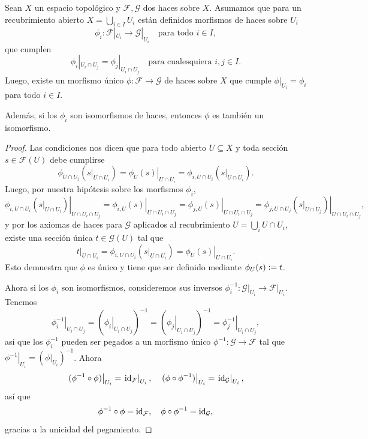 \documentclass{article}
\numberwithin{equation}{section}
\theoremstyle{definition}
\begin{document}
\begin{lema}
  \label{lema:pegamiento-de-morfismos-de-haces}
  Sean $X$ un espacio topológico y $\mathcal{F},\mathcal{G}$ dos haces sobre
  $X$. Asumamos que para un recubrimiento abierto $X = \bigcup_{i\in I} U_i$
  están definidos morfismos de haces sobre $U_i$
  \[ \phi_i\colon \mathcal{F}|_{U_i} \to \mathcal{G}|_{U_i}
     \quad\text{para todo }i\in I, \]
  que cumplen
  \[ \phi_i|_{U_i\cap U_j} = \phi_j|_{U_i\cap U_j}
     \quad\text{para cualesquiera }i,j\in I. \]
  Luego, existe un morfismo único $\phi\colon \mathcal{F} \to \mathcal{G}$ de
  haces sobre $X$ que cumple $\phi|_{U_i} = \phi_i$ para todo $i \in I$.

  Además, si los $\phi_i$ son isomorfismos de haces, entonces $\phi$ es también
  un isomorfismo.

  \begin{proof}
    Las condiciones nos dicen que para todo abierto $U \subseteq X$ y toda
    sección $s \in \mathcal{F} (U)$ debe cumplirse
    $$\phi_{U \cap U_i} (\left.s\right|_{U \cap U_i}) =
    \left.\phi_U (s)\right|_{U \cap U_i} =
    \phi_{i, U \cap U_i} (\left.s\right|_{U \cap U_i}).$$
    Luego, por nuestra hipótesis sobre los morfismos $\phi_i$,
    \[ \left.\phi_{i, U\cap U_i} (\left.s\right|_{U\cap U_i})\right|_{U\cap U_i\cap U_j} =
       \left.\phi_{i,U} (s)\right|_{U\cap U_i\cap U_j} =
       \left.\phi_{j,U} (s)\right|_{U\cap U_i\cap U_j} =
       \left.\phi_{j,U\cap U_j} (\left.s\right|_{U\cap U_j})\right|_{U\cap U_i\cap U_j}, \]
    y por los axiomas de haces para $\mathcal{G}$ aplicados al recubrimiento
    $U = \bigcup_i U \cap U_i$, existe una sección única $t \in \mathcal{G} (U)$
    tal que
    \[ \left.t\right|_{U\cap U_i} =
       \phi_{i,U \cap U_i} (\left.s\right|_{U\cap U_i}) =
       \left.\phi_U (s)\right|_{U\cap U_i}. \]
    Esto demuestra que $\phi$ es único y tiene que ser definido mediante
    $\phi_U (s) \mathrel{\mathop:}= t$.

    \vspace{1em}

    Ahora si los $\phi_i$ son isomorfismos, consideremos sus inversos
    $\phi_i^{-1}\colon \left.\mathcal{G}\right|_{U_i} \to \left.\mathcal{F}\right|_{U_i}$.
    Tenemos
    \[ \left.\phi_i^{-1}\right|_{U_i \cap U_j} =
       (\left.\phi_i\right|_{U_i \cap U_j})^{-1} =
       (\left.\phi_j\right|_{U_i \cap U_j})^{-1} =
       \left.\phi_j^{-1}\right|_{U_i \cap U_j}, \]
    así que los $\phi_i^{-1}$ pueden ser pegados a un morfismo único
    $\phi^{-1}\colon \mathcal{G} \to \mathcal{F}$ tal que
    $\left.\phi^{-1}\right|_{U_i} = (\left.\phi\right|_{U_i})^{-1}$. Ahora
    \[ \left.(\phi^{-1} \circ \phi)\right|_{U_i} =
       \left.\mathrm{id}_{\mathcal{F}}\right|_{U_i}, \quad
       \left.(\phi \circ \phi^{-1})\right|_{U_i} =
       \left.\mathrm{id}_{\mathcal{G}}\right|_{U_i}, \]
    así que
    \[ \phi^{-1} \circ \phi = \mathrm{id}_{\mathcal{F}}, \quad
       \phi \circ \phi^{-1} = \mathrm{id}_{\mathcal{G}}, \]
    gracias a la unicidad del pegamiento.
  \end{proof}
\end{lema}
\end{document}
